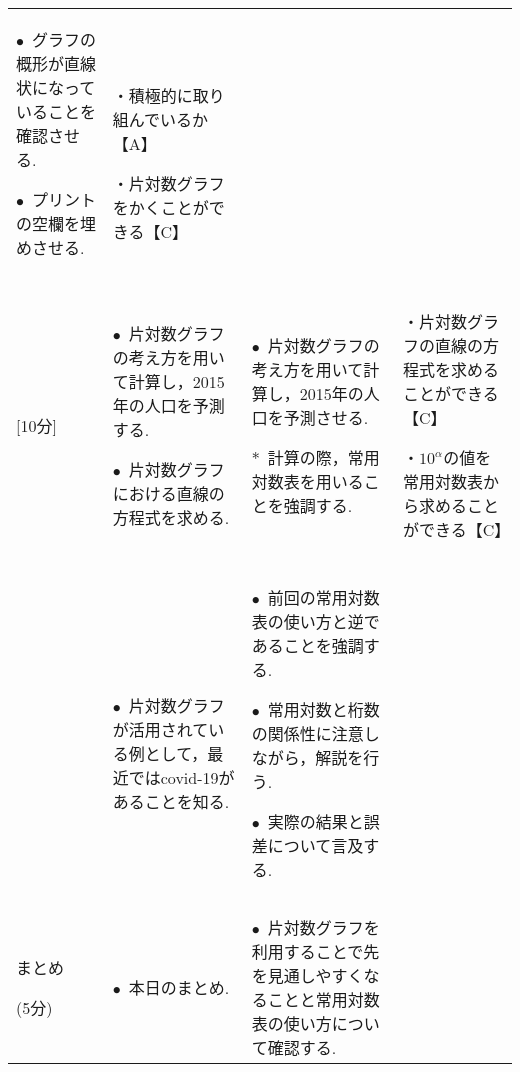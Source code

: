 \documentclass[a4paper,onecolumn,dvipdfmx]{jsarticle}
\theoremstyle{mydefinition}
\newtheorem[topline=true,rightline=true,bottomline=true,linecolor=cyan,linewidth=2pt,shadow=true,shadowcolor=cyan!70!white,shadowsize=5pt]{dfn}{定義}
\newtheorem[topline=true,rightline=true,bottomline=true,linecolor=magenta,linewidth=2pt,shadow=true,shadowcolor=magenta!70!white,shadowsize=5pt]{thm}[dfn]{定理}
\newtheorem[topline=true,rightline=true,bottomline=true]{prop}[dfn]{命題}
\newtheorem[topline=true,rightline=true,bottomline=true]{lem}[dfn]{補題}
\newtheorem[topline=true,rightline=true,bottomline=true]{cor}{系}
\newtheorem[topline=true,rightline=true,bottomline=true,linewidth=2pt]{fact}{事実}
\newtheorem[topline=true,rightline=true,bottomline=true]{Exam}{応用例題}
\newtheorem[bottomline=true]{ex}{例}
\newtheorem[rightline=true,linewidth=2pt]{prob}{問題}
\newtheorem[topline=true,rightline=true,bottomline=true]{prc}{練習}
\begin{document}
\begin{enumerate}
\begin{longtable}{|p{}|p{}|p{}|p{}|}
			    $\bullet$\ グラフの概形が直線状になっていることを確認させる.\vspace{3zw}
			    
			    $\bullet$\ プリントの空欄を埋めさせる.
			    &
			    {\footnotesize ~\vspace{12.75zw}
			    	
			    	・積極的に取り組んでいるか【A】
			    	
			    	・片対数グラフをかくことができる【C】
			    }\\
		        &&&\\
		        &&&\\
		        
		        [10分]&$\bullet$\ 片対数グラフの考え方を用いて計算し，2015年の人口を予測する.\vspace{0.5zw}
		        
		        $\bullet$\ 片対数グラフにおける直線の方程式を求める.
		        
		        &$\bullet$\ 片対数グラフの考え方を用いて計算し，2015年の人口を予測させる.\vspace{2.5zw}
		        
		        $*$\ 計算の際，常用対数表を用いることを強調する.
		        
		        
		        &
		        {\footnotesize ・片対数グラフの直線の方程式を求めることができる【C】
		        	
		        	・$10^{\alpha}$の値を常用対数表から求めることができる【C】}\\
	        	&&&\\
	        	&~\vspace{12zw}
	        	
	        	$\bullet$\ 片対数グラフが活用されている例として，最近ではcovid-19があることを知る.
	        	&$\bullet$\ 前回の常用対数表の使い方と逆であることを強調する.\vspace{0.5zw}
	        	
	        	$\bullet$\ 常用対数と桁数の関係性に注意しながら，解説を行う.\vspace{1zw}
	        	
	        	$\bullet$\ 実際の結果と誤差について言及する.&\\
	        	&&&\\
	        	&&&\\\hline
	        	まとめ
	        	
	        	(5分)
	        	&
	        	$\bullet$\ 本日のまとめ.&$\bullet$\ 片対数グラフを利用することで先を見通しやすくなることと常用対数表の使い方について確認する.&\\\hline
		    
				
			\end{longtable}
		
		
		
		
		
	\end{enumerate}
	
\end{document}
